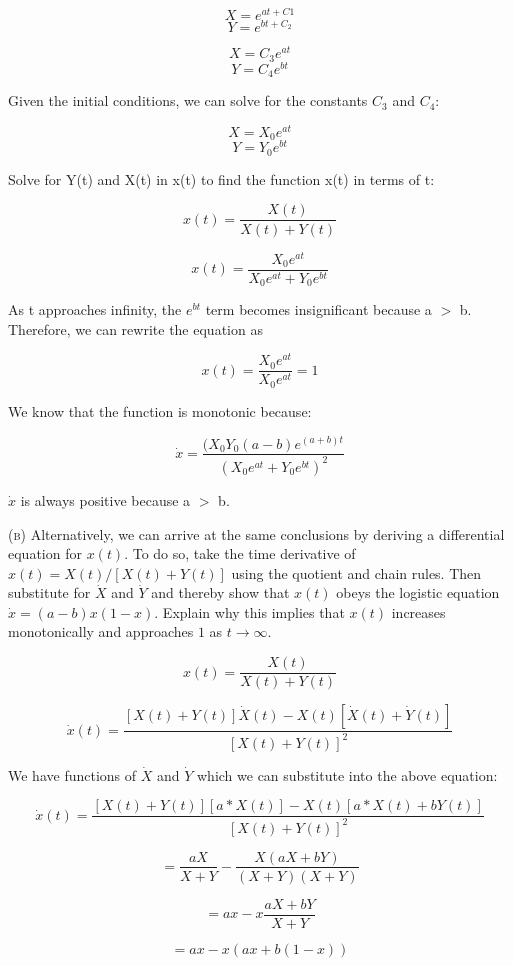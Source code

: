\documentclass[11pt,answers]{exam}
\renewcommand{\exp}[1]{e^{#1}}
\begin{document}
\begin{questions}
\begin{solution}
$$X = \exp{at+C1}$$ $$Y = \exp{bt+C_2}$$

$$X = C_3\exp{at}$$ $$Y = C_4\exp{bt}$$

Given the initial conditions, we can solve for the constants $C_3$ and $C_4$:

$$ X = X_{0}\exp{at}$$ $$ Y = Y_{0}\exp{bt}$$

Solve for Y(t) and X(t) in x(t) to find the function x(t) in terms of t:

$$x(t) = \frac{X(t)}{X(t) + Y(t)}$$

$$x(t) = \frac{X_{0}\exp{at}}{X_{0}\exp{at} + Y_{0}\exp{bt}}$$

As t approaches infinity, the $\exp{bt}$ term becomes insignificant because a $>$ b. Therefore, we can rewrite the equation as 

$$x(t) = \frac{X_{0}\exp{at}}{X_{0}\exp{at}} = 1$$

We know that the function is monotonic because:

$$\dot{x} = \frac{(X_{0}Y_{0}(a-b)e^{(a+b)t}}{(X_{0}e^{at}+Y_{0}e^{bt})^2}$$

$\dot{x}$ is always positive because a $>$ b. 

\end{solution}

\textsc{(b)} Alternatively, we can arrive at the same conclusions by deriving a differential equation for $x(t)$. To do so, take the time derivative of $x(t) = X(t)/[X(t) + Y(t)]$ using the quotient and chain rules. Then substitute for $\dot{X}$ and $\dot{Y}$ and thereby show that $x(t)$ obeys the logistic equation $\dot{x} = (a-b)x(1-x)$.  Explain why this implies that $x(t)$ increases monotonically and approaches $1$ as $t \to \infty$.

\begin{solution}

$$x(t) = \frac{X(t)}{X(t) + Y(t)}$$

$$\dot{x}(t) = \frac{[X(t) + Y(t)]\dot{X}(t) - X(t)[\dot{X}(t) + \dot{Y}(t)]}{[X(t) + Y(t)]^2}$$

We have functions of $\dot{X}$ and $\dot{Y}$ which we can substitute into the above equation:

$$\dot{x}(t) = \frac{[X(t) + Y(t)][a*X(t)] - X(t)[a*X(t) + bY(t)]}{[X(t) + Y(t)]^2}$$

$$ = \frac{aX}{X+Y} - \frac{X(aX+bY)}{(X+Y)(X+Y)}$$

$$ = ax - x\frac{aX+bY}{X+Y}$$

$$ = ax - x(ax+b(1-x))$$


\end{solution}
\end{questions}
\end{document}
